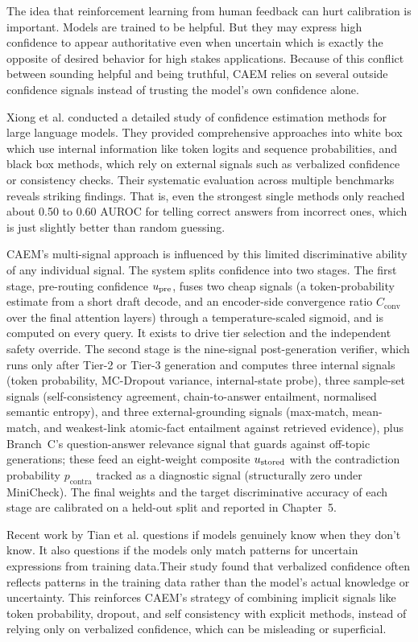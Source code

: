 The idea that reinforcement learning from human feedback can hurt calibration is important. Models are trained to be helpful. But they may express high confidence to appear authoritative even when uncertain which is exactly the opposite of desired behavior for high stakes applications. Because of this conflict between sounding helpful and being truthful, CAEM relies on several outside confidence signals instead of trusting the model's own confidence alone.

Xiong et al. \cite{xiong2023can} conducted a detailed study of confidence estimation methods for large language models. They provided comprehensive approaches into white box which use internal information like token logits and sequence probabilities, and black box methods, which rely on external signals such as verbalized confidence or consistency checks. Their systematic evaluation across multiple benchmarks reveals striking findings. That is, even the strongest single methods only reached about 0.50 to 0.60 AUROC for telling correct answers from incorrect ones, which is just slightly better than random guessing.

CAEM's multi-signal approach is influenced by this limited discriminative ability of any individual signal. The system splits confidence into two stages. The first stage, pre-routing confidence $u_{\text{pre}}$, fuses two cheap signals (a token-probability estimate from a short draft decode, and an encoder-side convergence ratio $C_{\text{conv}}$ over the final attention layers) through a temperature-scaled sigmoid, and is computed on every query. It exists to drive tier selection and the independent safety override. The second stage is the nine-signal post-generation verifier, which runs only after Tier-2 or Tier-3 generation and computes three internal signals (token probability, MC-Dropout variance, internal-state probe), three sample-set signals (self-consistency agreement, chain-to-answer entailment, normalised semantic entropy), and three external-grounding signals (max-match, mean-match, and weakest-link atomic-fact entailment against retrieved evidence), plus Branch~C's question-answer relevance signal that guards against off-topic generations; these feed an eight-weight composite $u_{\text{stored}}$ with the contradiction probability $p_{\text{contra}}$ tracked as a diagnostic signal (structurally zero under MiniCheck). The final weights and the target discriminative accuracy of each stage are calibrated on a held-out split and reported in Chapter~5.

Recent work by Tian et al. \cite{tian2023just} questions if models genuinely know when they don't know. It also questions if the models only match patterns for uncertain expressions from training data.Their study found that verbalized confidence often reflects patterns in the training data rather than the model's actual knowledge or uncertainty. This reinforces CAEM's strategy of combining implicit signals like token probability, dropout, and self consistency with explicit methods, instead of relying only on verbalized confidence, which can be misleading or superficial.

